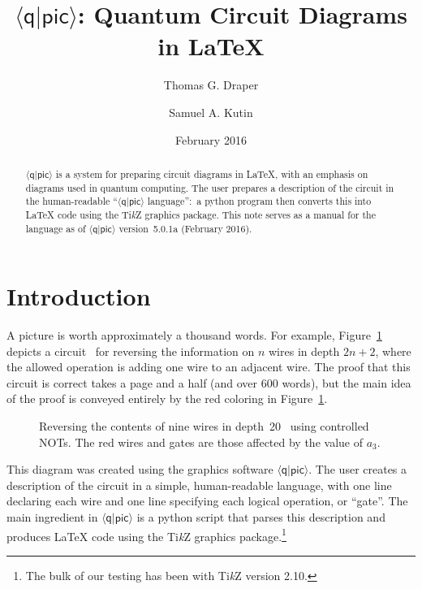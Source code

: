 \documentclass[twoside,12pt]{article}
\title{$\langle\mathsf{q}|\mathsf{pic}\rangle$: Quantum Circuit Diagrams in \LaTeX}
\author{Thomas G. Draper \and Samuel A. Kutin}
\date{February 2016}
\newcommand{\qpic}{$\langle\mathsf{q}|\mathsf{pic}\rangle$\xspace}
\newcommand{\TikZ}{Ti\emph{k}Z\xspace}
\begin{document}
\maketitle
\begin{abstract} 
{$\langle\mathsf{q}|\mathsf{pic}\rangle$\xspace} is a system
for preparing circuit diagrams in \LaTeX, with an emphasis on diagrams
used in quantum computing.  The user prepares a description of the
circuit in the human-readable
``{$\langle\mathsf{q}|\mathsf{pic}\rangle$\xspace} language'':\ a
python program then converts this into {\LaTeX} code using the
{Ti\emph{k}Z\xspace} graphics package.  This note serves as a manual
for the language as of
{$\langle\mathsf{q}|\mathsf{pic}\rangle$\xspace} version~5.0.1a
(February 2016).
\end{abstract}

\tableofcontents
\newpage

\section{Introduction}

A picture is worth approximately a thousand words.  For example, Figure~\ref{fig-rev} depicts a
circuit~\cite{kutin-moulton-smithline} for reversing the information on $n$ wires in depth $2n+2$,
where the allowed operation is adding one wire to an adjacent wire.  The proof that this circuit
is correct takes a page and a half (and over 600 words), but the main idea of the proof is conveyed
entirely by the red coloring in Figure~\ref{fig-rev}.

\begin{figure}[h!]
\begin{center}

\end{center}
\caption{Reversing the contents of nine wires in depth~20~\cite{kutin-moulton-smithline} using controlled NOTs.  The red wires and gates are those affected by the value of $a_3$.}
\label{fig-rev}
\end{figure}


This diagram was created using the graphics software \qpic.  The user creates a description of the
circuit in a simple, human-readable language, with one line declaring each wire and one line specifying each
logical operation, or ``gate''.  The main ingredient in \qpic is a python script that parses this description
and produces {\LaTeX} code using the \TikZ graphics package.\footnote{The bulk of our testing has been with \TikZ version 2.10.}
\end{document}
